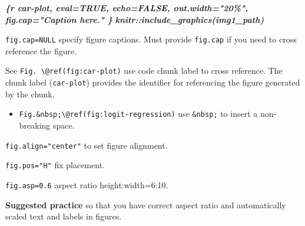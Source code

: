 \documentclass[
  a4paper,
  twoside,
  openright]{book}
\newenvironment{Shaded}{\begin{snugshade}}{\end{snugshade}}
\newcommand{\InformationTok}[1]{\textcolor[rgb]{0.56,0.35,0.01}{\textbf{\textit{#1}}}}
\providecommand{\tightlist}{%
  \setlength{\itemsep}{0pt}\setlength{\parskip}{0pt}}
\theoremstyle{definition}
\theoremstyle{definition}
\theoremstyle{definition}
\theoremstyle{definition}
\theoremstyle{remark}
\begin{document}
\begin{Shaded}
\begin{Highlighting}[]
\InformationTok{\textasciigrave{}\textasciigrave{}\textasciigrave{}\{r car{-}plot, eval=TRUE, echo=FALSE, out.width="20\%", fig.cap="Caption here." \}}
\InformationTok{knitr::include\_graphics(img1\_path) }
\InformationTok{\textasciigrave{}\textasciigrave{}\textasciigrave{}}
\end{Highlighting}
\end{Shaded}

\texttt{fig.cap=NULL} specify figure captions. Must provide \texttt{fig.cap} if you need to cross reference the figure.

See {\texttt{Fig.\ \textbackslash{}@ref(fig:car-plot)}} use code chunk label to cross reference. The chunk label (\texttt{car-plot}) provides the identifier for referencing the figure generated by the chunk.

\begin{itemize}
\tightlist
\item
  \texttt{Fig.\&nbsp;\textbackslash{}@ref(fig:logit-regression)} use \texttt{\&nbsp;} to insert a {non-breaking space}.
\end{itemize}

{\texttt{fig.align="center"}} to set figure alignment.

\texttt{fig.pos="H"} fix placement.

\texttt{fig.asp=0.6} aspect ratio height:width=6:10.

{\textbf{Suggested practice}} so that you have correct aspect ratio and automatically scaled text and labels in figures.
\end{document}
